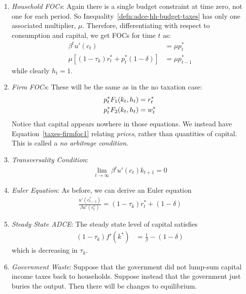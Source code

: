 \documentclass[12pt]{article}
\theoremstyle{plain}
\theoremstyle{definition}
\theoremstyle{remark}
\newcommand{\limt}{\lim_{t\rightarrow\infty}}
\begin{document}
\begin{enumerate}
  \item \emph{Household FOCs}: Again there is a single budget
    constraint at time zero, not one for each period. So
    Inequality~\ref{defn:adce-hh-budget-taxes} has only one associated
    multiplier, $\mu$. Therefore, differentiating with respect to
    consumption and capital, we get FOCs for time $t$ as:
    \begin{align}
      \beta^t u'(c_t) &= \mu p_t^* \label{taxes-hhfoc1}\\
      \mu[(1-\tau_k)r_t^* + p_t^* (1-\delta)]
      &= \mu p_{t-1}^* \label{taxes-hhfoc2}
    \end{align}
    while clearly $h_t=1$.

  \item \emph{Firm FOCs}: These will be the same as in the no taxation
    case:
    \begin{align}
      p^*_t F_1(k_t,h_t) &= r_t^* \label{taxes-firmfoc1}\\
      p^*_t F_2(k_t,h_t) &= w_t^* \notag
    \end{align}
    Notice that capital appears nowhere in those equations.
    We instead have Equation~\ref{taxes-firmfoc1} relating
    \emph{prices}, rather than quantities of capital. This is called a
    \emph{no arbitrage condition}.

  \item \emph{Transversality Condition}:
    \begin{align*}
      \limt \beta^t u'(c_t) k_{t+1}=0
    \end{align*}

  \item \emph{Euler Equation}: As before, we can derive an Euler
    equation
    \begin{align}
      \frac{u'(c_{t-1}^*)}{\beta u'(c_{t}^*)}
      = (1-\tau_k) r_t^* + (1-\delta)
    \end{align}

  \item \emph{Steady State ADCE}: The steady state level of capital
    satisfies
    \begin{align*}
      (1-\tau_k) f'(k^*) &= \frac{1}{\beta} - (1-\delta)
    \end{align*}
    which is decreasing in $\tau_k$.

  \item \emph{Government Waste}: Suppose that the government did not
    lump-sum capital income taxes back to households. Suppose instead
    that the government just buries the output. Then there will be
    changes to equilibrium.


\end{enumerate}
\end{document}
